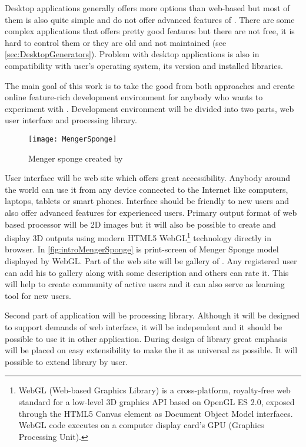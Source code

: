 Desktop applications generally offers more options than web-based but most of them is also quite simple and do not offer advanced features of \lsystems.
There are some complex applications that offers pretty good features but there are not free, it is hard to control them or they are old and not maintained (see \autoref{sec:DesktopGenerators}).
Problem with desktop applications is also in compatibility with user's operating system, its version and installed libraries.

The main goal of this work is to take the good from both approaches and create online feature-rich development environment for anybody who wants to experiment with \lsystems.
Development environment will be divided into two parts, web user interface and \lsystem processing library.

\begin{wrapfigure}{r}{0.5\textwidth}
	\texttt{[image: MengerSponge]}
	\caption{Menger sponge created by \lsystem}
	\label{fig:introMengerSponge}
\end{wrapfigure}

User interface will be web site which offers great accessibility.
Anybody around the world can use it from any device connected to the Internet like computers, laptops, tablets or smart phones.
Interface should be friendly to new users and also offer advanced features for experienced users.
Primary output format of web based \lsystem processor will be 2D images but it will also be possible to create and display 3D outputs using modern HTML5 WebGL\footnote{
	WebGL (Web-based Graphics Library) is a cross-platform, royalty-free web standard for a low-level 3D graphics API based on OpenGL ES 2.0, exposed through the HTML5 Canvas element as Document Object Model interfaces.
	WebGL code executes on a computer display card's GPU (Graphics Processing Unit).} technology directly in browser.
In \autoref{fig:introMengerSponge} is print-screen of Menger Sponge model displayed by WebGL.
Part of the web site will be gallery of \lsystems.
Any registered user can add his \lsystems to gallery along with some description and others can rate it.
This will help to create community of active users and it can also serve as learning tool for new users.

Second part of application will be \lsystem processing library.
Although it will be designed to support demands of web interface, it will be independent and it should be possible to use it in other application.
During design of library great emphasis will be placed on easy extensibility to make the it as universal as possible.
It will possible to extend library by user.

